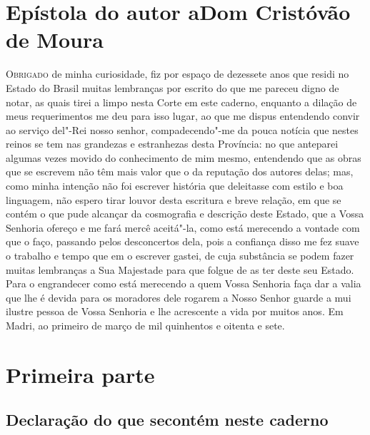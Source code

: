 \chapter[Epístola do autor a Dom Cristóvão de Moura]{Epístola do autor a\break Dom
Cristóvão de Moura}


\textsc{Obrigado} de minha curiosidade, fiz por espaço de dezessete anos que residi no
Estado do Brasil muitas lembranças por escrito do que me pareceu digno de notar, as quais
tirei a limpo nesta Corte em este caderno, enquanto a dilação de meus requerimentos me deu
para isso lugar, ao que me dispus entendendo convir ao serviço del"-Rei nosso senhor,
compadecendo"-me da pouca notícia que nestes reinos se tem nas grandezas e estranhezas
desta Província: no que anteparei algumas vezes movido do conhecimento de mim mesmo,
entendendo que as obras que se escrevem não têm mais valor que o da reputação dos autores
delas; mas, como minha intenção não foi escrever história que deleitasse com estilo e boa
linguagem, não espero tirar louvor desta escritura e breve relação, em que se contém o que
pude alcançar da cosmografia e descrição deste Estado, que a Vossa Senhoria ofereço e me
fará mercê aceitá"-la, como está merecendo a vontade com que o faço, passando pelos
desconcertos dela, pois a confiança disso me fez suave o trabalho e tempo que em o
escrever gastei, de cuja substância se podem fazer muitas lembranças a Sua Majestade para
que folgue de as ter deste seu Estado. Para o engrandecer como está merecendo a quem Vossa
Senhoria faça dar a valia que lhe é devida para os moradores dele rogarem a Nosso Senhor
guarde a mui ilustre pessoa de Vossa Senhoria e lhe acrescente a vida por muitos anos. Em
Madri, ao primeiro de março de mil quinhentos e oitenta e sete.


\chapter[Primeira parte: Roteiro geral]{Primeira parte }

\section*[Declaração do que se contém neste caderno]{Declaração do que se\break contém
neste caderno}


